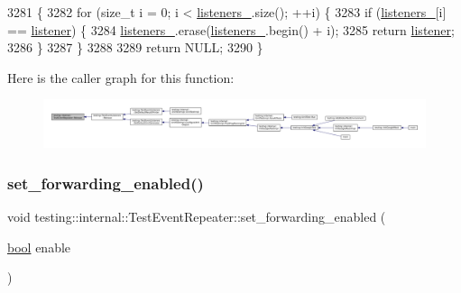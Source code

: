 \begin{DoxyCode}
3281                                                                          \{
3282   \textcolor{keywordflow}{for} (\textcolor{keywordtype}{size\_t} i = 0; i < \hyperlink{classtesting_1_1internal_1_1TestEventRepeater_a1c08e9302639108588d764b671c54825}{listeners\_}.size(); ++i) \{
3283     \textcolor{keywordflow}{if} (\hyperlink{classtesting_1_1internal_1_1TestEventRepeater_a1c08e9302639108588d764b671c54825}{listeners\_}[i] == \hyperlink{namespaceinteractive__marker_a0e579ab555212bb5e2c9f8a675b7618a}{listener}) \{
3284       \hyperlink{classtesting_1_1internal_1_1TestEventRepeater_a1c08e9302639108588d764b671c54825}{listeners\_}.erase(\hyperlink{classtesting_1_1internal_1_1TestEventRepeater_a1c08e9302639108588d764b671c54825}{listeners\_}.begin() + i);
3285       \textcolor{keywordflow}{return} \hyperlink{namespaceinteractive__marker_a0e579ab555212bb5e2c9f8a675b7618a}{listener};
3286     \}
3287   \}
3288 
3289   \textcolor{keywordflow}{return} NULL;
3290 \}
\end{DoxyCode}
Here is the caller graph for this function\+:
\nopagebreak
\begin{figure}[H]
\begin{center}
\leavevmode
\includegraphics[width=350pt]{classtesting_1_1internal_1_1TestEventRepeater_ac77a3d127e4726e11694e4ee9cf3b793_icgraph}
\end{center}
\end{figure}
\mbox{\label{classtesting_1_1internal_1_1TestEventRepeater_a86c52e311b70598a385a0589277e92e0}} 
\subsubsection{\texorpdfstring{set\+\_\+forwarding\+\_\+enabled()}{set\_forwarding\_enabled()}}
{\footnotesize\ttfamily void testing\+::internal\+::\+Test\+Event\+Repeater\+::set\+\_\+forwarding\+\_\+enabled (\begin{DoxyParamCaption}\item[{\hyperlink{classbool}{bool}}]{enable }\end{DoxyParamCaption})\hspace{0.3cm}{\ttfamily [inline]}}



